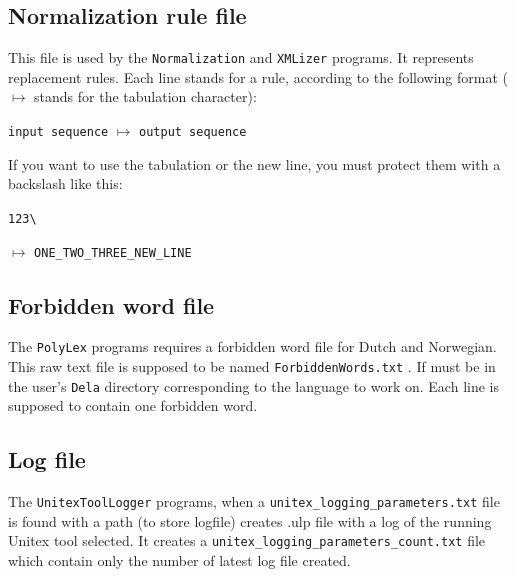 \subsection{Normalization rule file}
\label{section-normalization-file}
This file is used by the \verb+Normalization+ and \verb+XMLizer+ programs. It
represents replacement rules. Each line stands for a rule, according to the
following format ($\longmapsto$ stands for the tabulation character):

\bigskip
\noindent \verb+input sequence+ $\longmapsto$ \verb+output sequence+

\bigskip
\noindent If you want to use the tabulation or the new line, you must protect
them with a backslash like this:

\bigskip
\noindent
\verb+123\+

\noindent
$\longmapsto$ \verb+ONE_TWO_THREE_NEW_LINE+



\subsection{Forbidden word file}
 \label{section-forbidden-words}
The \verb+PolyLex+ programs requires a forbidden word file for Dutch and
Norwegian. This raw text file is supposed to be named \verb+ForbiddenWords.txt+
. If must be in the user's \verb+Dela+
directory corresponding to the language to work on. Each line is supposed to
contain one forbidden word.



\subsection{Log file}
 \label{section-log-file}
The \verb+UnitexToolLogger+ programs, when a \verb+unitex_logging_parameters.txt+ file
is found with a path (to store logfile) creates .ulp file with a log of the running
Unitex tool selected.
It creates a \verb+unitex_logging_parameters_count.txt+ file which contain only the number
of latest log file created.

